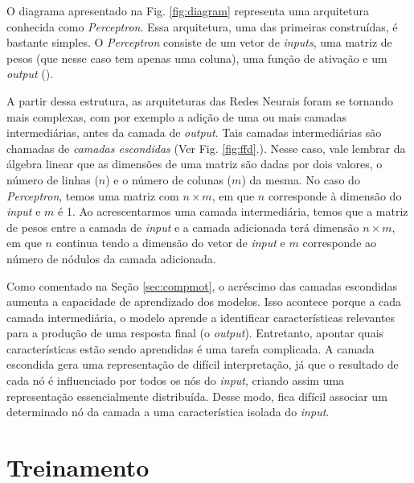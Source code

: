 
 O diagrama apresentado na Fig. \ref{fig:diagram} representa uma arquitetura conhecida como \textit{Perceptron}. Essa arquitetura, uma das primeiras construídas, é bastante simples. O \textit{Perceptron} consiste de um vetor de \textit{inputs}, uma matriz de pesos (que nesse caso tem apenas uma coluna), uma função de ativação e um \textit{output} (\cite{Rosenblatt:1957}). 
 
 A partir dessa estrutura, as arquiteturas das Redes Neurais foram se tornando mais complexas, com por exemplo a adição de uma ou mais camadas intermediárias, antes da camada de \textit{output}. Tais camadas intermediárias são chamadas de \textit{camadas escondidas} (Ver Fig. \ref{fig:ffd}.). Nesse caso, vale lembrar da álgebra linear que as dimensões de uma matriz são dadas por dois valores, o número de linhas ($n$) e o número de colunas ($m$) da mesma. No caso do \textit{Perceptron}, temos uma matriz com $n \times m$, em que $n$ corresponde à dimensão do \textit{input} e $m$ é 1. Ao acrescentarmos uma camada intermediária, temos que a matriz de pesos entre a camada de \textit{input} e a camada adicionada terá dimensão $n \times m$, em que $n$ continua tendo a dimensão do vetor de \textit{input} e $m$ corresponde ao número de nódulos da camada adicionada.



Como comentado na Seção \ref{sec:compmot}, o acréscimo das camadas escondidas aumenta a capacidade de aprendizado dos modelos. Isso acontece porque a cada camada intermediária, o modelo aprende a identificar características relevantes para a produção de uma resposta final (o \textit{output}). Entretanto, apontar quais características estão sendo aprendidas é uma tarefa complicada. A camada escondida gera uma representação de difícil interpretação, já que o resultado de cada nó é influenciado por todos os nós do \textit{input}, criando assim uma representação essencialmente distribuída. Desse modo, fica difícil associar um determinado nó da camada a uma característica isolada do \textit{input}.

\section{Treinamento}

